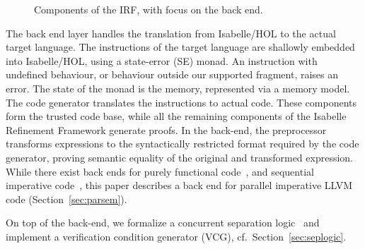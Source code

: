 \documentclass[sn-mathphys,Numbered]{sn-jnl}
\theoremstyle{thmstyleone}%
\theoremstyle{definition}%
\theoremstyle{thmstylethree}%
\begin{document}
\begin{figure}

  \caption{Components of the IRF, with focus on the back end.}\label{fig:IRF-overview}
\end{figure}
%
The back end layer handles the translation from Isabelle/HOL to the actual target language.
The instructions of the target language are shallowly embedded into Isabelle/HOL, using
a state-error (SE) monad. An instruction with undefined behaviour,
or behaviour outside our supported fragment, raises an error.
The state of the monad is the memory, represented via a memory model.
The code generator translates the instructions to actual code.
These components form the trusted code base, while all the remaining components of the
Isabelle Refinement Framework generate proofs. In the back-end, the preprocessor transforms
expressions to the syntactically restricted format required by the code generator,
proving semantic equality of the original and transformed expression.
While there exist back ends for purely functional code~\cite{LaTu12,La13},
and sequential imperative code~\cite{La15,La19-llvm}, this paper describes a back end
for parallel imperative LLVM code (Section~\ref{sec:parsem}).

On top of the back-end, we formalize a concurrent separation logic~\cite{OH04} and implement a verification condition generator (VCG), cf.\ Section~\ref{sec:seplogic}.
\end{document}
